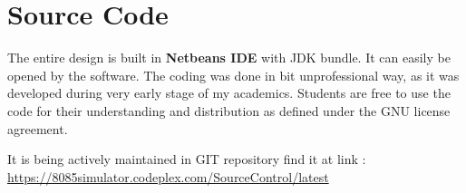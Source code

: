 \section{Source Code}
The entire design is built in \textbf{Netbeans IDE} with JDK bundle. It can easily be opened by the software. The coding was done in bit unprofessional way, as it was developed during very early stage of my academics. Students are free to use the code for their understanding and distribution as defined under the GNU license agreement. 


It is being actively maintained in GIT repository find it at link :\\
\url{https://8085simulator.codeplex.com/SourceControl/latest}
